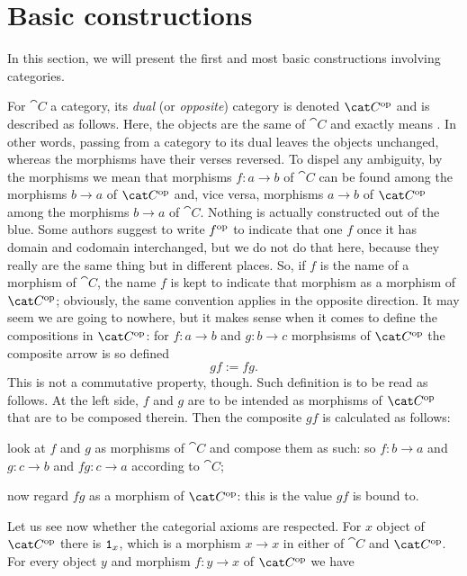 
\section{Basic constructions}

In this section, we will present the first and most basic constructions involving categories.

For \(\cat C\) a category, its {\em dual} (or {\em opposite}) category is denoted \(\op{\cat C}\) and is described as follows. Here, the objects are the same of \(\cat C\) and  exactly means . In other words, passing from a category to its dual leaves the objects unchanged, whereas the morphisms have their verses reversed. To dispel any ambiguity, by  the morphisms we mean that morphisms \(f : a \to b\) of \(\cat C\) can be found among the morphisms \(b \to a\) of \(\op{\cat C}\) and, vice versa, morphisms \(a \to b\) of \(\op{\cat C}\) among the morphisms \(b \to a\) of \(\cat C\). Nothing is actually constructed out of the blue. Some authors suggest to write \(f^\text{op}\) to indicate that one \(f\) once it has domain and codomain interchanged, but we do not do that here, because they really are the same thing but in different places. So, if \(f\) is the name of a morphism of \(\cat C\), the name \(f\) is kept to indicate that morphism as a morphism of \(\op{\cat C}\); obviously, the same convention applies in the opposite direction. It may seem we are going to nowhere, but it makes sense when it comes to define the compositions in \(\op{\cat C}\): for \(f : a \to b\) and \(g : b \to c\) morphsisms of \(\op{\cat C}\) the composite arrow is so defined
\[gf := fg .\label{defeqn:DualComp}\]
This is not a commutative property, though. Such definition is to be read as follows. At the left side, \(f\) and \(g\) are to be intended as morphisms of \(\op{\cat C}\) that are to be composed therein. Then the composite \(gf\) is calculated as follows:
\begin{tcbenum}
\item look at \(f\) and \(g\) as morphisms of \(\cat C\) and compose them as such: so \(f : b \to a\) and \(g : c \to b\) and \(fg : c \to a\) according to \(\cat C\);
\item now regard \(fg\) as a morphism of \(\op{\cat C}\): this is the value \(gf\) is bound to.
\end{tcbenum}
Let us see now whether the categorial axioms are respected. For \(x\) object of \(\op {\cat C}\) there is \(\mathtt 1_x\), which is a morphism \(x \to x\) in either of \(\cat C\) and \(\op{\cat C}\). For every object \(y\) and morphism \(f : y \to x\) of \(\op{\cat C}\) we have
